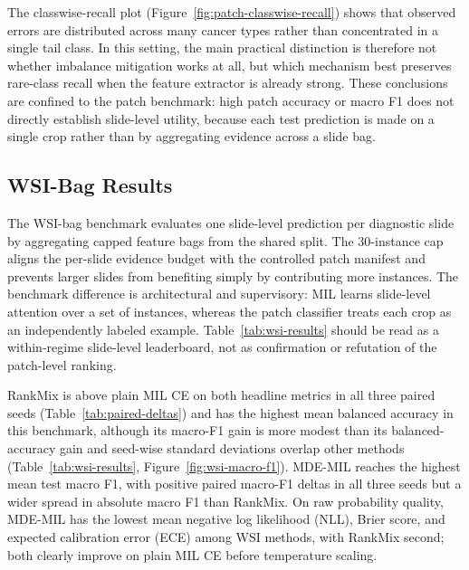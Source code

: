 \documentclass[11pt]{article}
\begin{document}
The classwise-recall plot (Figure~\ref{fig:patch-classwise-recall}) shows that observed errors are distributed across many cancer types rather than concentrated in a single tail class. In this setting, the main practical distinction is therefore not whether imbalance mitigation works at all, but which mechanism best preserves rare-class recall when the feature extractor is already strong. These conclusions are confined to the patch benchmark: high patch accuracy or macro F1 does not directly establish slide-level utility, because each test prediction is made on a single crop rather than by aggregating evidence across a slide bag.

\subsection{WSI-Bag Results}
\begin{table}[ht]
  \centering
  \small
  
  \caption{Validation-selected WSI-bag test results over three seeds. Methods share the same capped feature bags, attention-MIL backbone family, and evaluation code.}
  \label{tab:wsi-results}
\end{table}

The WSI-bag benchmark evaluates one slide-level prediction per diagnostic slide by aggregating capped feature bags from the shared split. The 30-instance cap aligns the per-slide evidence budget with the controlled patch manifest and prevents larger slides from benefiting simply by contributing more instances. The benchmark difference is architectural and supervisory: MIL learns slide-level attention over a set of instances, whereas the patch classifier treats each crop as an independently labeled example. Table~\ref{tab:wsi-results} should be read as a within-regime slide-level leaderboard, not as confirmation or refutation of the patch-level ranking.

RankMix is above plain MIL CE on both headline metrics in all three paired seeds (Table~\ref{tab:paired-deltas}) and has the highest mean balanced accuracy in this benchmark, although its macro-F1 gain is more modest than its balanced-accuracy gain and seed-wise standard deviations overlap other methods (Table~\ref{tab:wsi-results}, Figure~\ref{fig:wsi-macro-f1}). MDE-MIL reaches the highest mean test macro F1, with positive paired macro-F1 deltas in all three seeds but a wider spread in absolute macro F1 than RankMix. On raw probability quality, MDE-MIL has the lowest mean negative log likelihood (NLL), Brier score, and expected calibration error (ECE) among WSI methods, with RankMix second; both clearly improve on plain MIL CE before temperature scaling.
\end{document}
